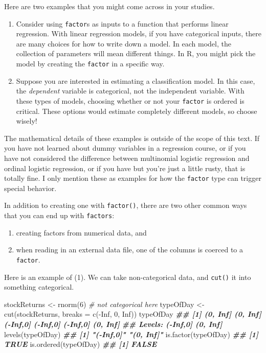 \documentclass[
  12pt,
  krantz2]{krantz}
\makeatletter
\newenvironment{Shaded}{\begin{snugshade}}{\end{snugshade}}
\newcommand{\AttributeTok}[1]{\textcolor[rgb]{0.61,0.61,0.61}{#1}}
\newcommand{\CommentTok}[1]{\textcolor[rgb]{0.37,0.37,0.37}{\textit{#1}}}
\newcommand{\ConstantTok}[1]{\textcolor[rgb]{0,0,0}{#1}}
\newcommand{\DecValTok}[1]{\textcolor[rgb]{0.06,0.06,0.06}{#1}}
\newcommand{\DocumentationTok}[1]{\textcolor[rgb]{0.37,0.37,0.37}{\textbf{\textit{#1}}}}
\newcommand{\FunctionTok}[1]{\textcolor[rgb]{0,0,0}{#1}}
\newcommand{\NormalTok}[1]{#1}
\newcommand{\OtherTok}[1]{\textcolor[rgb]{0.37,0.37,0.37}{#1}}
\newcommand{\SpecialCharTok}[1]{\textcolor[rgb]{0,0,0}{#1}}
\providecommand{\tightlist}{%
  \setlength{\itemsep}{0pt}\setlength{\parskip}{0pt}}
\newenvironment{kframe}{%
\medskip{}
\setlength{\fboxsep}{.8em}
 \def\at@end@of@kframe{}%
 \ifinner\ifhmode%
  \def\at@end@of@kframe{\end{minipage}}%
  \begin{minipage}{\columnwidth}%
 \fi\fi%
 \def\FrameCommand##1{\hskip\@totalleftmargin \hskip-\fboxsep
 \colorbox{shadecolor}{##1}\hskip-\fboxsep
     \hskip-\linewidth \hskip-\@totalleftmargin \hskip\columnwidth}%
 \MakeFramed {\advance\hsize-\width
   \@totalleftmargin\z@ \linewidth\hsize
   \@setminipage}}%
 {\par\unskip\endMakeFramed%
 \at@end@of@kframe}
\renewenvironment{Shaded}{\begin{kframe}}{\end{kframe}}
\makeatother
\begin{document}
Here are two examples that you might come across in your studies.

\begin{enumerate}
\def\labelenumi{\arabic{enumi}.}
\item
  Consider using \texttt{factor}s as inputs to a function that performs linear regression. With linear regression models, if you have categorical inputs, there are many choices for how to write down a model. In each model, the collection of parameters will mean different things. In R, you might pick the model by creating the \texttt{factor} in a specific way.
\item
  Suppose you are interested in estimating a classification model. In this case, the \emph{dependent} variable is categorical, not the independent variable. With these types of models, choosing whether or not your \texttt{factor} is ordered is critical. These options would estimate completely different models, so choose wisely!
\end{enumerate}

The mathematical details of these examples is outside of the scope of this text. If you have not learned about dummy variables in a regression course, or if you have not considered the difference between multinomial logistic regression and ordinal logistic regression, or if you have but you're just a little rusty, that is totally fine. I only mention these as examples for how the \texttt{factor} type can trigger special behavior.

In addition to creating one with \texttt{factor()}, there are two other common ways that you can end up with \texttt{factors}:

\begin{enumerate}
\def\labelenumi{\arabic{enumi}.}
\tightlist
\item
  creating factors from numerical data, and
\item
  when reading in an external data file, one of the columns is coerced to a \texttt{factor}.
\end{enumerate}

Here is an example of (1). We can take non-categorical data, and \texttt{cut()} it into something categorical.

\begin{Shaded}
\begin{Highlighting}[]
\NormalTok{stockReturns }\OtherTok{\textless{}{-}} \FunctionTok{rnorm}\NormalTok{(}\DecValTok{6}\NormalTok{) }\CommentTok{\# not categorical here}
\NormalTok{typeOfDay }\OtherTok{\textless{}{-}} \FunctionTok{cut}\NormalTok{(stockReturns, }\AttributeTok{breaks =} \FunctionTok{c}\NormalTok{(}\SpecialCharTok{{-}}\ConstantTok{Inf}\NormalTok{, }\DecValTok{0}\NormalTok{, }\ConstantTok{Inf}\NormalTok{)) }
\NormalTok{typeOfDay}
\DocumentationTok{\#\# [1] (0, Inf] (0, Inf] ({-}Inf,0] ({-}Inf,0] ({-}Inf,0] (0, Inf]}
\DocumentationTok{\#\# Levels: ({-}Inf,0] (0, Inf]}
\FunctionTok{levels}\NormalTok{(typeOfDay)}
\DocumentationTok{\#\# [1] "({-}Inf,0]" "(0, Inf]"}
\FunctionTok{is.factor}\NormalTok{(typeOfDay)}
\DocumentationTok{\#\# [1] TRUE}
\FunctionTok{is.ordered}\NormalTok{(typeOfDay)}
\DocumentationTok{\#\# [1] FALSE}
\end{Highlighting}
\end{Shaded}
\end{document}
